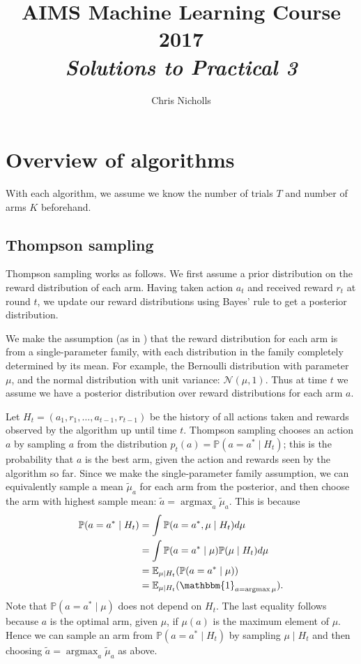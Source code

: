 \documentclass[10pt]{article}
\title{AIMS Machine Learning Course 2017 \\ \emph{Solutions to Practical 3}}
\author{Chris Nicholls}
\newcommand{\EE}{\mathbb{E}}
\newcommand{\PP}{\mathbb{P}}
\newcommand{\indicator}{\mathbbm{1}}
\DeclareMathOperator{\argmax}{argmax}
\begin{document}
\maketitle

\section{Overview of algorithms}
With each algorithm, we assume we know the number of trials $T$ and number of
arms $K$ beforehand.

\subsection{Thompson sampling}
Thompson sampling works as follows. We first assume a prior distribution on the
reward distribution of each arm. Having taken action $a_t$ and received reward
$r_t$ at round $t$, we update our reward distributions using Bayes' rule to get
a posterior distribution.

We make the assumption (as in \cite{Slivkins}) that the reward distribution for
each arm is from a single-parameter family, with each distribution in the family
completely determined by its mean. For example, the Bernoulli distribution with
parameter $\mu$, and the normal distribution with unit variance:
$\mathcal{N}(\mu, 1)$. Thus at time $t$ we assume we have a posterior
distribution over reward distributions for each arm $a$.

Let $H_t = (a_1, r_1, \ldots, a_{t-1}, r_{t-1})$ be the history of all actions
taken and rewards observed by the algorithm up until time $t$. Thompson sampling
chooses an action $a$ by sampling $a$ from the distribution $p_t(a) = \PP(a =
a^* \mid H_t)$; this is the probability that $a$ is the best arm, given the
action and rewards seen by the algorithm so far. Since we make the
single-parameter family assumption, we can equivalently sample a mean
$\tilde{\mu}_a$ for each arm from the posterior, and then choose the arm with
highest sample mean: $\tilde{a} = \argmax_a \tilde{\mu}_a$. This is because
\begin{align*}
    \PP(a = a^* \mid H_t) &= \int \PP(a = a^*, \mu \mid H_t) d \mu \\
    &= \int \PP(a = a^* \mid  \mu) \PP(\mu \mid H_t) d \mu \\
    &= \EE_{\mu \mid H_t} (\PP(a = a^* \mid \mu)) \\
    &= \EE_{\mu \mid H_t} (\indicator_{a = \argmax{\mu}}).
\end{align*}
Note that $\PP(a = a^* \mid \mu)$ does not depend on $H_t$. The last equality
follows because $a$ is the optimal arm, given $\mu$, if $\mu(a)$ is the maximum
element of $\mu$. Hence we can sample an arm from $\PP(a = a^* \mid H_t)$ by
sampling $\mu \mid H_t$ and then choosing $\tilde{a} = \argmax_a \tilde{\mu}_a$ as above.
\end{document}
